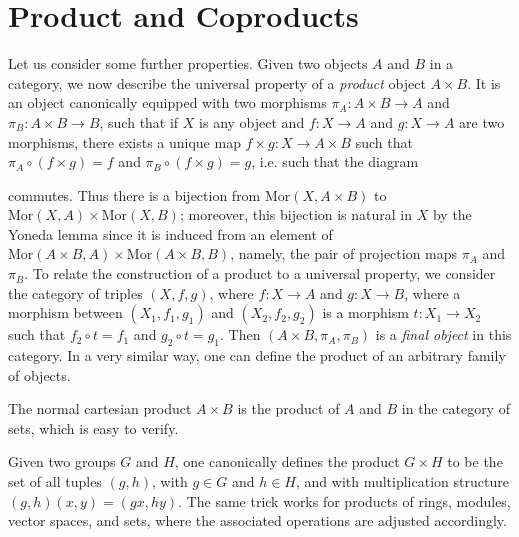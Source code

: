 \section{Product and Coproducts}

Let us consider some further properties. Given two objects $A$ and $B$ in a category, we now describe the universal property of a \emph{product} object $A \times B$. It is an object canonically equipped with two morphisms $\pi_A: A \times B \to A$ and $\pi_B: A \times B \to B$, such that if $X$ is any object and $f: X \to A$ and $g: X \to A$ are two morphisms, there exists a unique map $f \times g: X \to A \times B$ such that $\pi_A \circ (f \times g) = f$ and $\pi_B \circ (f \times g) = g$, i.e. such that the diagram
%
\begin{center}
\end{center}
%
commutes. Thus there is a bijection from $\text{Mor}(X,A \times B)$ to $\text{Mor}(X,A) \times \text{Mor}(X,B)$; moreover, this bijection is natural in $X$ by the Yoneda lemma since it is induced from an element of $\text{Mor}(A \times B, A) \times \text{Mor}(A \times B, B)$, namely, the pair of projection maps $\pi_A$ and $\pi_B$. To relate the construction of a product to a universal property, we consider the category of triples $(X,f,g)$, where $f: X \to A$ and $g: X \to B$, where a morphism between $(X_1,f_1,g_1)$ and $(X_2,f_2,g_2)$ is a morphism $t: X_1 \to X_2$ such that $f_2 \circ t = f_1$ and $g_2 \circ t = g_1$. Then $(A \times B, \pi_A, \pi_B)$ is a \emph{final object} in this category. In a very similar way, one can define the product of an arbitrary family of objects.

\begin{example}
    The normal cartesian product $A \times B$ is the product of $A$ and $B$ in the category of sets, which is easy to verify.
\end{example}

\begin{example}
    Given two groups $G$ and $H$, one canonically defines the product $G \times H$ to be the set of all tuples $(g,h)$, with $g \in G$ and $h \in H$, and with multiplication structure $(g,h)(x,y) = (gx,hy)$. The same trick works for products of rings, modules, vector spaces, and sets, where the associated operations are adjusted accordingly.
\end{example}

